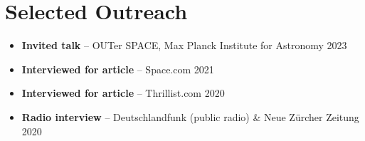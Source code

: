 \section*{Selected Outreach}

\begin{itemize}
    \item \textbf{Invited talk} -- OUTer SPACE, Max Planck Institute for Astronomy \hfill 2023
    \item \textbf{Interviewed for article} -- Space.com \hfill 2021
    \item \textbf{Interviewed for article} -- Thrillist.com \hfill 2020
    \item \textbf{Radio interview} -- Deutschlandfunk (public radio) \& Neue Zürcher Zeitung \hfill 2020
\end{itemize}